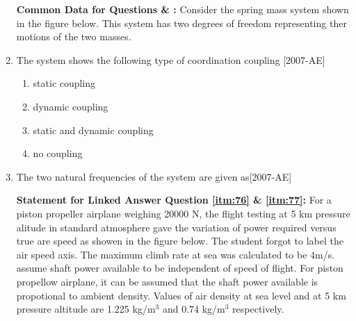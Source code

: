 \documentclass[journal]{IEEEtran}
\begin{document}
\begin{enumerate}
        \textbf{Common Data for Questions \label{itm:74} \& \label{itm:75}:} Consider the spring mass system shown in the figure below. This system has two degrees of freedom representing ther motions of the two masses.

        \begin{wrapfigure}
            \centering
            
        \end{wrapfigure}\hfill
    \item The system shows the following type of coordination coupling \label{itm:74}\hfill{[2007-AE]}
        \begin{enumerate}
            \item static coupling
            \item dynamic coupling
            \item static and dynamic coupling
            \item no coupling
        \end{enumerate}
    \item The two natural frequencies of the system are given as\label{itm:75}\hfill{[2007-AE]}
        \begin{enumerate}
        \end{enumerate}

\textbf{Statement for Linked Answer Question \ref{itm:76} \& \ref{itm:77}:} For a piston propeller airplane weighing 20000 N, the flight testing at 5 km pressure alitude in standard atmosphere gave the variation of power required versus true are speed as showen in the figure below. The student forgot to label the air speed axis. The maximum climb rate at sea was calculated to be 4m/s. assume shaft power available to be independent of speed of flight. For piston propellow airplane, it can be assumed that the shaft power available is propotional to ambient density. Values of air density at sea level and at 5 km pressure altitude are 1.225 kg/m$^3$ and 0.74 kg/m$^3$ respectively.


\end{enumerate}
\end{document}
